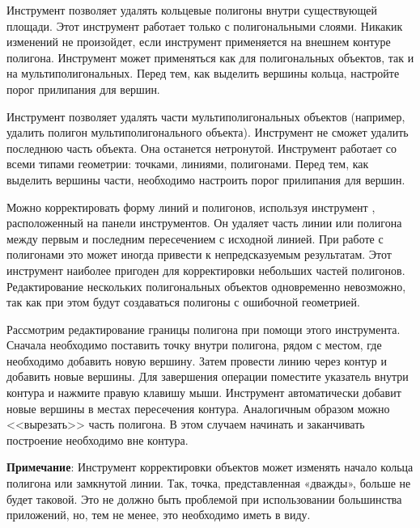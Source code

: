 Инструмент  позволяет удалять
кольцевые полигоны внутри существующей площади. Этот инструмент работает
только с полигональными слоями. Никакик изменений не произойдет, если
инструмент применяется на внешнем контуре полигона. Инструмент может
применяться как для полигональных объектов, так и на мультиполигональных.
Перед тем, как выделить вершины кольца, настройте порог прилипания для вершин.


Инструмент  позволяет удалять
части мультиполигональных объектов (например, удалить полигон
мультиполигонального объекта). Инструмент не сможет удалить последнюю часть
объекта. Она останется нетронутой. Инструмент работает со всеми типами
геометрии: точками, линиями, полигонами. Перед тем, как выделить вершины
части, необходимо настроить порог прилипания для вершин.


Можно корректировать форму линий и полигонов, используя инструмент
, расположенный на
панели инструментов. Он удаляет часть линии или полигона между первым и
последним пересечением с исходной линией. При работе с полигонами это
может иногда привести к непредсказуемым результатам. Этот инструмент
наиболее пригоден для корректировки небольших частей полигонов. Редактирование
нескольких  полигональных объектов одновременно невозможно, так как при этом
будут создаваться полигоны с ошибочной геометрией.

Рассмотрим редактирование границы полигона при помощи этого инструмента.
Сначала необходимо поставить точку внутри полигона, рядом с местом, где
необходимо добавить новую вершину. Затем провести линию через контур и
добавить новые вершины. Для завершения операции поместите указатель внутри
контура и нажмите правую клавишу мыши. Инструмент автоматически добавит
новые вершины в местах пересечения контура. Аналогичным образом можно
<<вырезать>> часть полигона. В этом случаем начинать и заканчивать
построение необходимо вне контура.

\textbf{Примечание}: Инструмент корректировки объектов может изменять начало
кольца полигона или замкнутой линии. Так, точка, представленная «дважды»,
больше не будет таковой. Это не должно быть проблемой при использовании
большинства приложений, но, тем не менее, это необходимо иметь в виду.

